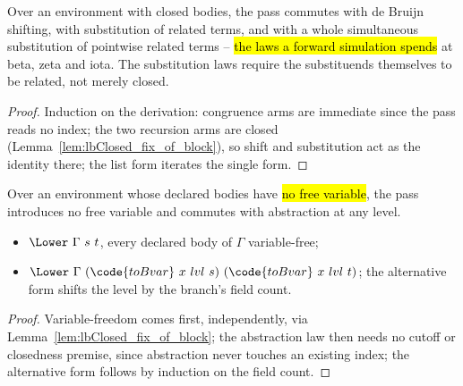 \begin{proposition}
\label{prop:Lower-subst_comm}
\leanok
{}
 Over an environment with closed bodies, the pass commutes with de Bruijn shifting, with
substitution of related terms, and with a whole simultaneous substitution of pointwise related terms --
\hl{the laws a forward simulation spends} at beta, zeta and iota.
 The
substitution laws require the substituends themselves to be related, not merely closed.
\end{proposition}
\begin{proof}
\leanok
{}
 Induction on the derivation: congruence arms are immediate since the pass reads no index;
the two recursion arms are closed (Lemma~\ref{lem:lbClosed_fix_of_block}), so shift and substitution act
as the identity there; the list form iterates the single form.
\end{proof}

\begin{proposition}
\label{prop:Lower-abstract}
\leanok
{}
 Over an environment whose declared bodies have \hl{no free variable}, the pass
introduces no free variable and commutes with abstraction at any level.
\begin{itemize}
\item {} $\Lower\ \Gamma\ s\ t$, every declared body of $\Gamma$ variable-free;
\item {} $\Lower\ \Gamma\ (\code{toBvar}\ x\ lvl\ s)\ (\code{toBvar}\ x\ lvl\ t)$; the
alternative form shifts the level by the branch's field count.
\end{itemize}
\end{proposition}
\begin{proof}
\leanok
{}
 Variable-freedom comes first, independently, via Lemma~\ref{lem:lbClosed_fix_of_block}; the
abstraction law then needs no cutoff or closedness premise, since abstraction never touches an existing
index; the alternative form follows by induction on the field count.
\end{proof}

